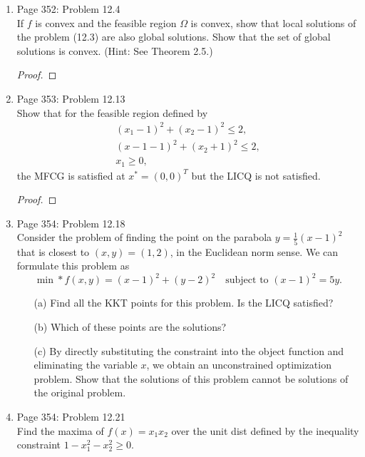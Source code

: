 \documentclass[11pt, oneside]{article}
\begin{document}
\begin{enumerate}
  \item %
    Page 352: Problem 12.4 \\
    If $f$ is convex and the feasible region $\Omega$ is convex, show that local
    solutions of the problem (12.3) are also global solutions.
    Show that the set of global solutions is convex.
    (Hint: See Theorem 2.5.)

    \begin{proof}
      
    \end{proof}

  \item %
    Page 353: Problem 12.13 \\
    Show that for the feasible region defined by
    \begin{align*}
      (x_1 - 1)^2 + (x_2 - 1)^2 \le 2, \\
      (x-1 - 1)^2 + (x_2 + 1)^2 \le 2, \\
      x_1 \ge 0,
    \end{align*}
    the MFCG is satisfied at $x^* = (0, 0)^T$ but the LICQ is not satisfied.

    \begin{proof}
      
    \end{proof}

  \item %
    Page 354: Problem 12.18 \\
    Consider the problem of finding the point on the parabola
    $y = \frac{1}{5}(x - 1)^2$ that is closest to $(x, y) = (1, 2)$, in the
    Euclidean norm sense.
    We can formulate this problem as
    \[
      \min*{f(x, y)} = (x - 1)^2 + (y - 2)^2 \quad \text{subject to } (x - 1)^2 = 5y.
    \]
    \begin{enumerate}
      \item[(a)]
        Find all the KKT points for this problem.
        Is the LICQ satisfied?

      \item[(b)]
        Which of these points are the solutions?

      \item[(c)]
        By directly substituting the constraint into the object function and
        eliminating the variable $x$, we obtain an unconstrained optimization
        problem.
        Show that the solutions of this problem cannot be solutions of the
        original problem.

    \end{enumerate}

  \item %
    Page 354: Problem 12.21 \\
    Find the maxima of $f(x) = x_1 x_2$ over the unit dist defined by the
    inequality constraint $1 - x_1^2 - x_2^2 \ge 0$.

\end{enumerate}
\end{document}
